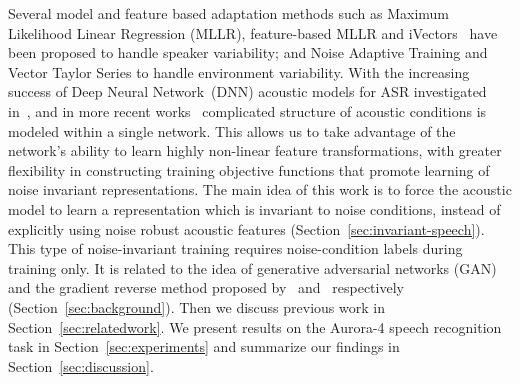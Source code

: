 \documentclass[a4paper]{article}
\begin{document}
    Several model and feature based adaptation methods such as Maximum 
    Likelihood Linear Regression (MLLR),  feature-based MLLR and 
    iVectors~\citep{saon2013speaker} have been proposed to handle speaker 
    variability; and Noise Adaptive Training \citep[NAT;][]{kalinli2010noise}
    and Vector Taylor Series \citep[VTS;][]{un1998speech} to handle 
    environment variability.
    With the increasing success of Deep Neural 
    Network~(DNN) acoustic models for ASR investigated 
    in~\citep{hinton2012deep,seide2011conversational,sainath2011making}, 
    and in more recent works~\citep{miao2015eesen,sainath2015learning} 
    complicated structure of acoustic conditions is modeled within a single network.
    This allows us to take 
    advantage of the network's ability to learn highly non-linear feature 
    transformations, with greater flexibility in constructing training 
    objective functions that promote learning of noise invariant 
    representations.
    The main idea of this work is to force the acoustic model 
    to learn a representation which is invariant to noise conditions, instead of 
    explicitly using noise robust acoustic features 
    (Section~\ref{sec:invariant-speech}). This type of noise-invariant 
    training requires noise-condition labels during training only. It is 
    related to the idea of generative adversarial networks (GAN) and the 
    gradient reverse method proposed by~\cite{goodfellow2014generative} 
    and~\cite{ganin2014unsupervised} respectively 
    (Section~\ref{sec:background}). Then we discuss previous work in 
    Section~\ref{sec:relatedwork}. 
    We present results on the Aurora-4 speech 
    recognition task in Section~\ref{sec:experiments} and summarize 
    our findings in Section~\ref{sec:discussion}.

\end{document}
